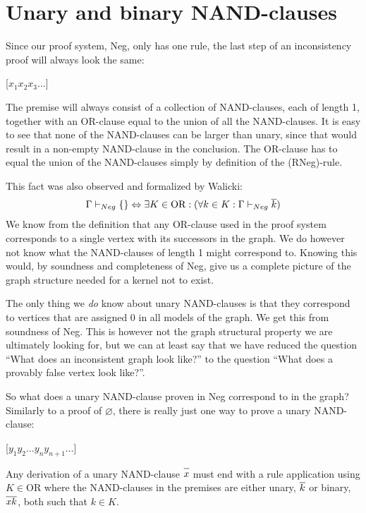 \section{Unary and binary NAND-clauses}
\label{sec:Unary and binary NAND-clauses}
Since our proof system, Neg, only has one rule, the last step of an inconsistency proof will always look the same:
\begin{prooftree*}
  \Hypo{\dots}
  [$x_1x_2x_3\dots$]{\varnothing}
\end{prooftree*}
The premise will always consist of a collection of NAND-clauses, each of length 1, together with an OR-clause equal to the union of all the NAND-clauses.
It is easy to see that none of the NAND-clauses can be larger than unary, since that would result in a non-empty NAND-clause in the conclusion.
The OR-clause has to equal the union of the NAND-clauses simply by definition of the (RNeg)-rule.

This fact was also observed and formalized by Walicki\cite{michal-completeness}:
\begin{align}
  \Gamma \vdash_{Neg} \{\} \Leftrightarrow \exists K \in \text{OR}: (\forall  k \in K: \Gamma \vdash_{Neg} \ol{k})
\end{align}
We know from the definition that any OR-clause used in the proof system corresponds to a single vertex with its successors in the graph.
We do however not know what the NAND-clauses of length 1 might correspond to.
Knowing this would, by soundness and completeness of Neg, give us a complete picture of the graph structure needed for a kernel not to exist.

The only thing we \textit{do} know about unary NAND-clauses is that they correspond to vertices that are assigned 0 in all models of the graph.
We get this from soundness of Neg.
This is however not the graph structural property we are ultimately looking for, but we can at least say that we have reduced the question ``What does an inconsistent graph look like?'' to the question ``What does a provably false vertex look like?''.

So what does a unary NAND-clause proven in Neg correspond to in the graph?
Similarly to a proof of $\varnothing$, there is really just one way to prove a unary NAND-clause:
\begin{prooftree*}
  \Hypo{\dots}
  \Hypo{\dots}
  [$y_1y_2\dots y_ny_{n+1}\dots$]{}
\end{prooftree*}
Any derivation of a unary NAND-clause $\ol{x}$ must end with a rule application using $K \in \text{OR}$ where the NAND-clauses in the premises are either unary, $\ol{k}$ or binary, $\ol{xk}$, both such that $k \in K$.

